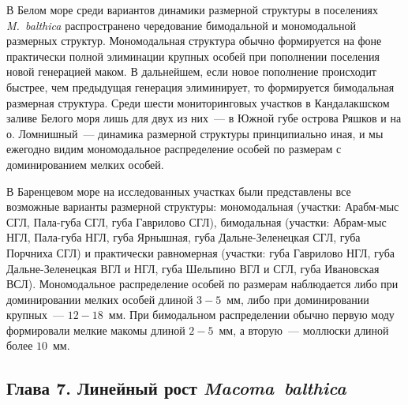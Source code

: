 {В Белом море среди вариантов динамики размерной структуры в поселениях {\it M.~balthica} распространено чередование бимодальной и мономодальной размерных структур.
Мономодальная структура обычно формируется на фоне практически полной элиминации крупных особей при пополнении поселения новой генерацией маком.
В дальнейшем, если новое пополнение происходит быстрее, чем предыдущая генерация элиминирует, то формируется бимодальная размерная структура.
Среди шести мониторинговых участков в Кандалакшском заливе Белого моря лишь для двух из них~--- в Южной губе острова Ряшков и на о. Ломнишный~--- динамика размерной структуры принципиально иная, и мы ежегодно видим мономодальное распределение особей по размерам с доминированием мелких особей.

В Баренцевом море на исследованных участках были представлены все возможные варианты размерной структуры: мономодальная (участки: Арабм-мыс СГЛ, Пала-губа СГЛ, губа Гаврилово СГЛ), бимодальная (участки: Абрам-мыс НГЛ, Пала-губа НГЛ, губа Ярнышная, губа Дальне-Зеленецкая СГЛ, губа Порчниха СГЛ) и практически равномерная (участки: губа Гаврилово НГЛ, губа Дальне-Зеленецкая ВГЛ и НГЛ, губа Шельпино ВГЛ и СГЛ, губа Ивановская ВСЛ). 
Мономодальное распределение особей по размерам наблюдается либо при доминировании мелких особей длиной $3-5$~мм, либо при доминировании крупных~--- $12-18$~мм.
При бимодальном распределении обычно первую моду формировали мелкие макомы длиной $2-5$~мм, а вторую~--- моллюски длиной более $10$~мм.



\subsection*{Глава 7. Линейный рост \textit{Macoma~balthica}}

}
